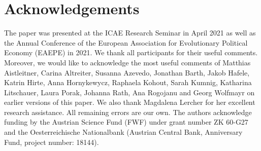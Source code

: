 \section*{Acknowledgements}
The paper was presented at the ICAE Research Seminar in April 2021 as well as the Annual Conference of the European Association for Evolutionary Political Economy (EAEPE) in 2021. We thank all participants for their useful comments. Moreover, we would like to acknowledge the most useful comments of Matthias Aistleitner, Carina Altreiter, Susanna Azevedo, Jonathan Barth, Jakob Hafele, Katrin Hirte, Anna Hornykewycz, Raphaela Kohout, Sarah Kumnig, Katharina Litschauer, Laura Porak, Johanna Rath, Ana Rogojanu and Georg Wolfmayr on earlier versions of this paper. We also thank Magdalena Lercher for her excellent research assistance. All remaining errors are our own. 
The authors acknowledge funding by the 
Austrian Science Fund (FWF) under grant number ZK 60-G27 and the
Oesterreichische Nationalbank 
(Austrian Central Bank, Anniversary Fund, project number: 18144).
\clearpage

